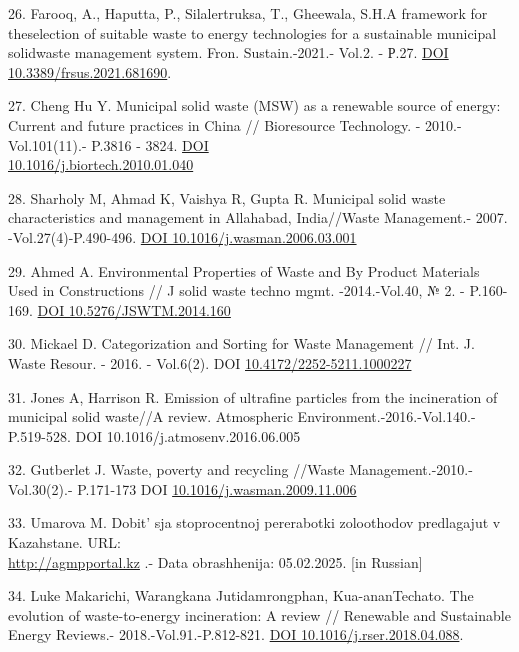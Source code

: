 \begin{references}
26. Farooq, A., Haputta, P., Silalertruksa, T., Gheewala, S.H.A
framework for theselection of suitable waste to energy technologies for
a sustainable municipal solidwaste management system. Fron.
Sustain.-2021.- Vol.2. - Р.27.
\href{https://doi.org/10.3389/frsus.2021.681690}{DOI
10.3389/frsus.2021.681690}.

27. Cheng Hu Y. Municipal solid waste (MSW) as a renewable source of
energy: Current and future practices in China // Bioresource Technology.
- 2010.-Vol.101(11).- P.3816 - 3824.
\href{https://doi.org/10.1016/j.biortech.2010.01.040}{DOI \\10.1016/j.biortech.2010.01.040}

28. Sharholy M, Ahmad K, Vaishya R, Gupta R. Municipal solid waste
characteristics and management in Allahabad, India//Waste Management.-
2007. -Vol.27(4)-P.490-496.
\href{https://doi.org/10.1016/j.wasman.2006.03.001}{DOI
10.1016/j.wasman.2006.03.001}

29. Ahmed A. Environmental Properties of Waste and By Product Materials
Used in Constructions // J solid waste techno mgmt. -2014.-Vol.40, № 2.
- P.160-169. \href{https://doi.org/10.5276/JSWTM.2014.160}{DOI
10.5276/JSWTM.2014.160}

30. Mickael D. Categorization and Sorting for Waste Management // Int.
J. Waste Resour. - 2016. - Vol.6(2). DOI
\href{http://dx.doi.org/10.4172/2252-5211.1000227}{10.4172/2252-5211.1000227}

31. Jones A, Harrison R. Emission of ultrafine particles from the
incineration of municipal solid waste//A review. Atmospheric
Environment.-2016.-Vol.140.-P.519-528. DOI 10.1016/j.atmosenv.2016.06.005

32. Gutberlet J. Waste, poverty and recycling //Waste
Management.-2010.-Vol.30(2).- P.171-173 DOI
\href{http://dx.doi.org/10.1016/j.wasman.2009.11.006}{10.1016/j.wasman.2009.11.006}

33. Umarova M. Dobit' sja stoprocentnoj pererabotki
zoloothodov predlagajut v Kazahstane. URL:\\
\href{http://agmpportal.kz/dobitsya-stoprotsentnoj-pererabotki-zoloothodov-predlagayut-v-kazahstane/}{http://agmpportal.kz} .-
Data obrashhenija: 05.02.2025. {[}in Russian{]}

34. Luke Makarichi, Warangkana Jutidamrongphan, Kua-ananTechato. The
evolution of waste-to-energy incineration: A review // Renewable and
Sustainable Energy Reviews.- 2018.-Vol.91.-P.812-821.
\href{https://doi.org/10.1016/j.rser.2018.04.088}{DOI
10.1016/j.rser.2018.04.088}.


\end{references}
